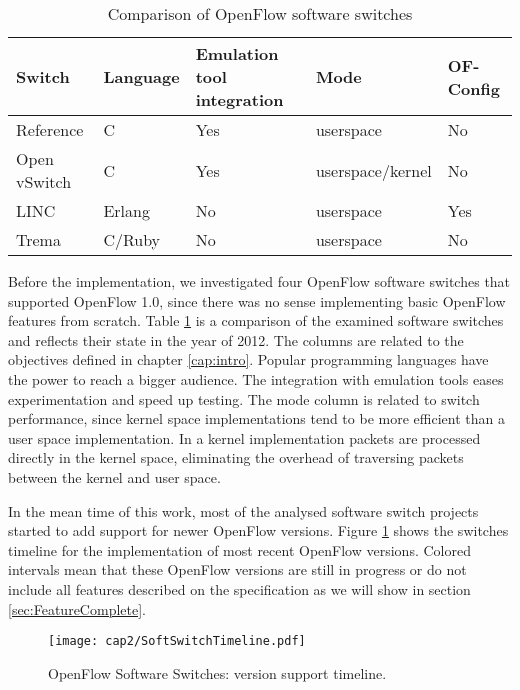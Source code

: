 \begin{table}[h]
\caption{Comparison of OpenFlow software switches}
\label{tab:relatedswitches}
\begin{tabular}{|l|l|l|l|l|}
\hline
\textbf{Switch} & \textbf{Language} & \textbf{Emulation tool integration} & \textbf{Mode}    & \textbf{OF-Config} \\ \hline
Reference       & C                 & Yes                        & userspace        & No                         \\ \hline
Open vSwitch    & C                 & Yes                        & userspace/kernel & No                         \\ \hline
LINC            & Erlang            & No                    & userspace        & Yes                        \\ \hline
Trema           & C/Ruby            & No                    & userspace        & No                         \\ \hline
\end{tabular}
\end{table}

Before the implementation, we investigated four OpenFlow software switches that supported OpenFlow 1.0, since there was no sense implementing basic OpenFlow features from scratch. Table \ref{tab:relatedswitches} is a comparison of the examined software switches and reflects their state in the year of 2012. The columns are related to the objectives defined in chapter \ref{cap:intro}. Popular programming languages have the power to reach a bigger audience. The integration with emulation tools eases experimentation and speed up testing. The mode column is related to switch performance, since kernel space implementations tend to be more efficient than a user space implementation. In a kernel implementation packets are processed directly in the kernel space, eliminating the overhead of traversing packets between the kernel and user space.

In the mean time of this work, most of the analysed software switch projects started to add support for newer OpenFlow versions. Figure \ref{fig:ofswitchtimeline} shows the switches timeline for the implementation of most recent OpenFlow versions. Colored intervals mean that these OpenFlow versions are still in progress or do not include all features described on the specification as we will show in section \ref{sec:FeatureComplete}.

\begin{figure}[H]
\centering
\texttt{[image: cap2/SoftSwitchTimeline.pdf]}
\caption{OpenFlow Software Switches: version support timeline.}
\label{fig:ofswitchtimeline}
\end{figure}

